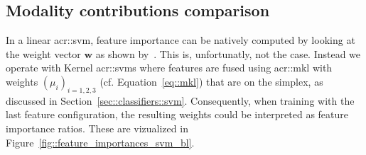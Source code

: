     \subsection{Modality contributions comparison}
        \label{subsec::advanced_experiments::classifier::feature_importance}
        In a linear \gls{acr::svm}, feature importance can be natively computed by looking at the weight vector \(\bm{w}\) as shown by~\textcite{guyon2002gene}.
        This is, unfortunatly, not the case.
        Instead we operate with Kernel \glspl{acr::svm} where features are fused using \gls{acr::mkl} with weights \(\left(\mu_i\right)_{i=1, 2, 3}\) (cf. Equation~\ref{eq::mkl}) that are on the simplex, as discussed in Section~\ref{sec::classifiers::svm}.
        Consequently, when training with the last feature configuration, the resulting weights could be interpreted as feature importance ratios.
        These are vizualized in Figure~\ref{fig::feature_importances_svm_bl}.\\

        \begin{figure}[htpb]
            \centering
        \end{figure}

